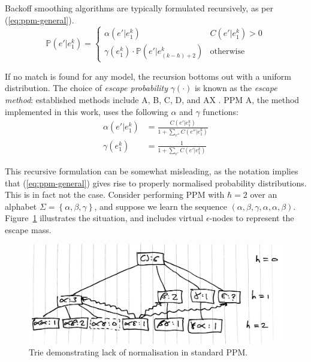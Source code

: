 \documentclass[12pt,a4paper,twoside,openright]{report}
\newcommand{\set}[1]{ \left\{ #1 \right\} }
\begin{document}
Backoff smoothing algorithms are typically formulated recursively, as per
(\ref{eq:ppm-general}).
\begin{equation}\label{eq:ppm-general}
  \mathbb{P}(e' | e_1^k) = \begin{cases}
  \alpha(e'|e_1^k) & C(e' | e_1^k) > 0 \\
\gamma(e_1^k) \cdot \mathbb{P}(e' | e_{(k - \hbar) + 2}^k) & \text{otherwise}
\end{cases} 
\end{equation} 

If no match is found for any model, the recursion bottoms out with a uniform
distribution. The choice of \emph{escape probability} $\gamma(\cdot)$ is known
as the \emph{escape method}: established methods include A, B, C, D, and AX
\cite{pearce2004improved}. PPM A, the method implemented in this work, uses the
following $\alpha$ and $\gamma$ functions:
\begin{align}
  \label{eq:ppm-a}
  \alpha(e' | e_1^k) &= \frac{ C(e' | e_1^k) }{ 1 + \sum_{e''} C(e'' | e_1^k) }
  \\
  \gamma(e_1^k) &= \frac{ 1 }{ 1 + \sum_{e'} C(e' | e_1^k) }
  \label{eq:ppm-escape}
\end{align}

This recursive formulation can be somewhat misleading, as the notation implies
that (\ref{eq:ppm-general}) gives rise to properly normalised probability
distributions.  This is in fact not the case. Consider performing PPM with
$\hbar = 2$ over an alphabet $\Sigma = \set{\alpha,\beta,\gamma}$, and suppose
we learn the sequence $(\alpha,\beta,\gamma,\alpha,\alpha,\beta)$.
Figure~\ref{fig:bad-ppm-trie} illustrates the situation, and includes virtual
$\epsilon$-nodes to represent the escape mass.

\begin{figure}[H]
\centering
\includegraphics[width=400pt]{figs/problematic_trie_tmp.jpg}
\caption{Trie demonstrating lack of normalisation in standard PPM.}
\label{fig:bad-ppm-trie}
\end{figure}
\end{document}

